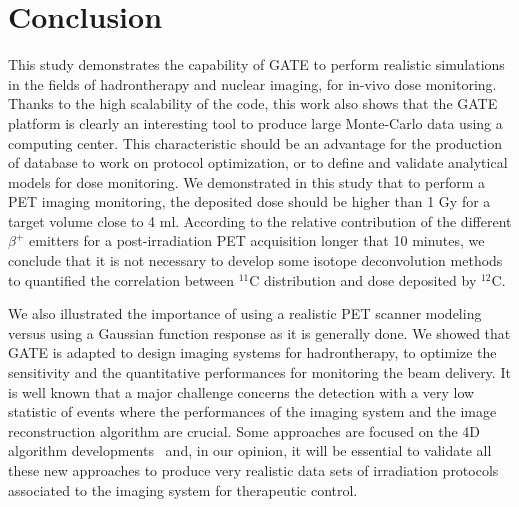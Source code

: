 \documentclass[11pt]{iopart}
\begin{document}
\clearpage
\section{Conclusion}

This study demonstrates the capability of GATE to perform realistic
simulations in the fields of hadrontherapy and nuclear imaging, for
in-vivo dose monitoring. Thanks to the high scalability of the code,
this work also shows that the GATE platform is clearly an interesting
tool to produce large Monte-Carlo data using a computing center. This
characteristic should be an advantage for the production of database
to work on protocol optimization, or to define and validate analytical
models for dose monitoring. We demonstrated in this study that to
perform a PET imaging monitoring, the deposited dose should be higher
than 1 Gy for a target volume close to 4 ml. According to the relative
contribution of the different $\beta^+$ emitters for a
post-irradiation PET acquisition longer that 10 minutes, we conclude
that it is not necessary to develop some isotope deconvolution methods
to quantified the correlation between $^{11}$C distribution and dose
deposited by $^{12}$C.

We also illustrated the importance of using a realistic PET scanner
modeling versus using a Gaussian function response as it is generally
done. We showed that GATE is adapted to design imaging systems for
hadrontherapy, to optimize the sensitivity and the quantitative
performances for monitoring the beam delivery. It is well known that a
major challenge concerns the detection with a very low statistic of
events where the performances of the imaging system and the image
reconstruction algorithm are crucial. Some approaches are focused on
the 4D algorithm developments~\cite{Fall2011} and, in our opinion, it
will be essential to validate all these new approaches to produce very
realistic data sets of irradiation protocols associated to the imaging
system for therapeutic control.



%
%

%
%

%

\end{document}
